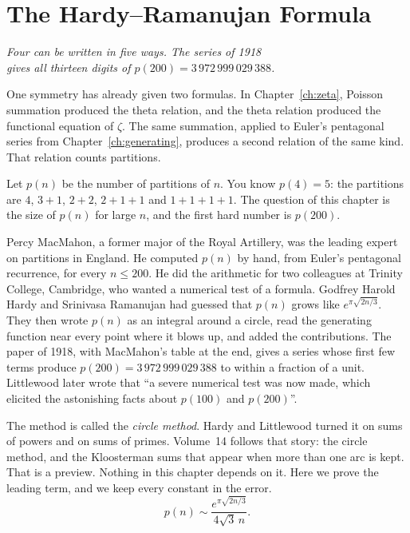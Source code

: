 \chapter{The Hardy--Ramanujan Formula}\label{ch:hr}
\begin{center}\itshape
Four can be written in five ways. The series of 1918\\
gives all thirteen digits of $p(200)=3\,972\,999\,029\,388$.
\end{center}

One symmetry has already given two formulas. In Chapter~\ref{ch:zeta}, Poisson summation produced the theta relation, and the theta relation produced the functional equation of $\zeta$. The same summation, applied to Euler's pentagonal series from Chapter~\ref{ch:generating}, produces a second relation of the same kind. That relation counts partitions.

Let $p(n)$ be the number of partitions of $n$. You know $p(4)=5$: the partitions are $4$, $3+1$, $2+2$, $2+1+1$ and $1+1+1+1$. The question of this chapter is the size of $p(n)$ for large $n$, and the first hard number is $p(200)$.

Percy MacMahon, a former major of the Royal Artillery, was the leading expert on partitions in England. He computed $p(n)$ by hand, from Euler's pentagonal recurrence, for every $n\le 200$. He did the arithmetic for two colleagues at Trinity College, Cambridge, who wanted a numerical test of a formula. Godfrey Harold Hardy and Srinivasa Ramanujan had guessed that $p(n)$ grows like $e^{\pi\sqrt{2n/3}}$. They then wrote $p(n)$ as an integral around a circle, read the generating function near every point where it blows up, and added the contributions. The paper of 1918, with MacMahon's table at the end, gives a series whose first few terms produce $p(200)=3\,972\,999\,029\,388$ to within a fraction of a unit. Littlewood later wrote that ``a severe numerical test was now made, which elicited the astonishing facts about $p(100)$ and $p(200)$''.

The method is called the \emph{circle method}. Hardy and Littlewood turned it on sums of powers and on sums of primes. Volume~14 follows that story: the circle method, and the Kloosterman sums that appear when more than one arc is kept. That is a preview. Nothing in this chapter depends on it. Here we prove the leading term, and we keep every constant in the error.
\[
p(n)\sim\frac{e^{\pi\sqrt{2n/3}}}{4\sqrt3\,n}.
\]



